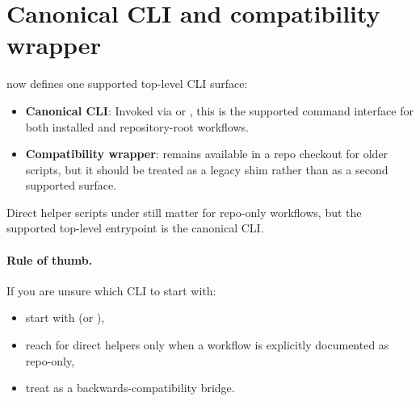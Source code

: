 \section{Canonical CLI and compatibility wrapper}
\yolozu{} now defines one supported top-level CLI surface:
\begin{itemize}
  \item \textbf{Canonical CLI}: Invoked via  or , this is the supported command interface for both installed and repository-root workflows.
  \item \textbf{Compatibility wrapper}:  remains available in a repo checkout for older scripts, but it should be treated as a legacy shim rather than as a second supported surface.
\end{itemize}

Direct helper scripts under  still matter for repo-only workflows, but the supported top-level entrypoint is the canonical  CLI.

\paragraph{Rule of thumb.}
If you are unsure which CLI to start with:
\begin{itemize}
  \item start with  (or ),
  \item reach for direct  helpers only when a workflow is explicitly documented as repo-only,
  \item treat  as a backwards-compatibility bridge.
\end{itemize}
